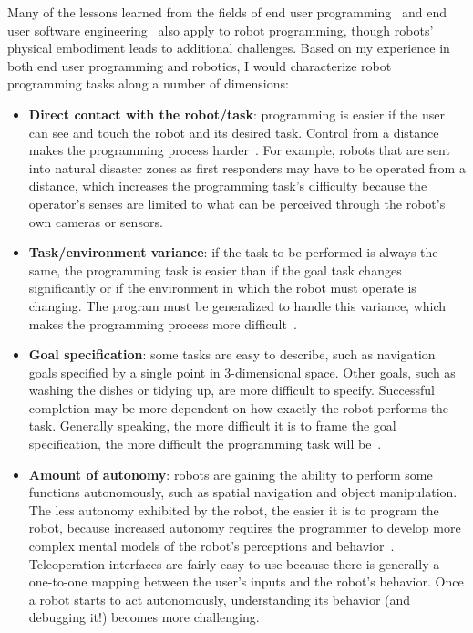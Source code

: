 \documentclass[10pt,twocolumn]{article}
\begin{document}
Many of the lessons learned from the fields of end user programming~\cite{dontcheva-nocode} and end user software engineering~\cite{ko-acm11} also apply to robot programming, though robots' physical embodiment leads to additional challenges. Based on my experience in both end user programming and robotics, I would characterize robot programming tasks along a number of dimensions:

\begin{itemize}
\item {\bf Direct contact with the robot/task}: programming is easier if the user can see and touch the robot and its desired task. Control from a distance makes the programming process harder~\cite{chen-ieeetos07}. For example, robots that are sent into natural disaster zones as first responders may have to be operated from a distance, which increases the programming task's difficulty because the operator's senses are limited to what can be perceived through the robot's own cameras or sensors.

\item {\bf Task/environment variance}: if the task to be performed is always the same, the programming task is easier than if the goal task changes significantly or if the environment in which the robot must operate is changing. The program must be generalized to handle this variance, which makes the programming process more difficult~\cite{cypher-chi91,bogart-vlhcc08}.

\item {\bf Goal specification}: some tasks are easy to describe, such as navigation goals specified by a single point in 3-dimensional space. Other goals, such as washing the dishes or tidying up, are more difficult to specify. Successful completion may be more dependent on how exactly the robot performs the task. Generally speaking, the more difficult it is to frame the goal specification, the more difficult the programming task will be~\cite{ko-vlhcc04}.

\item {\bf Amount of autonomy}: robots are gaining the ability to perform some functions autonomously, such as spatial navigation and object manipulation.  The less autonomy exhibited by the robot, the easier it is to program the robot, because increased autonomy requires the programmer to develop more complex mental models of the robot's perceptions and behavior~\cite{kulesza-chi12}. Teleoperation interfaces are fairly easy to use because there is generally a one-to-one mapping between the user's inputs and the robot's behavior. Once a robot starts to act autonomously, understanding its behavior (and debugging it!) becomes more challenging.
\end{itemize}
\end{document}
